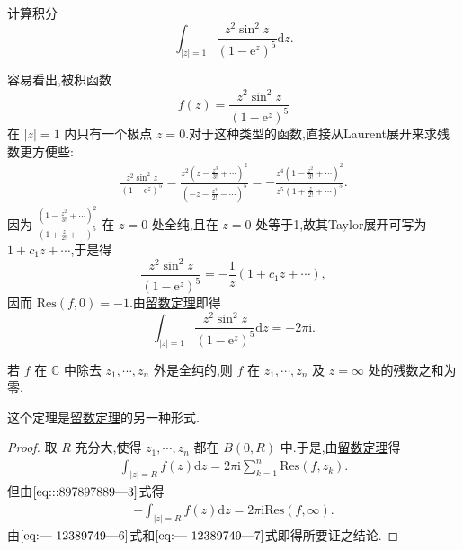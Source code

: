 \documentclass[../../main.tex]{subfiles}
\begin{document}
\begin{example}
计算积分
\[
\int_{|z| = 1} \frac{z^2 \sin^2 z}{(1 - \mathrm{e}^z)^5} \mathrm{d}z.
\]
\end{example}
\begin{solution}
容易看出,被积函数
\[
f(z) = \frac{z^2 \sin^2 z}{(1 - \mathrm{e}^z)^5}
\]
在 \( |z| = 1 \) 内只有一个极点 \( z = 0 \).对于这种类型的函数,直接从Laurent展开来求残数更方便些:
\begin{align*}
\frac{z^2 \sin^2 z}{(1 - \mathrm{e}^z)^5} = \frac{z^2 \left( z - \frac{z^3}{3!} + \cdots \right)^2}{\left( -z - \frac{z^2}{2!} - \cdots \right)^5} = -\frac{z^4 \left( 1 - \frac{z^2}{3!} + \cdots \right)^2}{z^5 \left( 1 + \frac{z}{2!} + \cdots \right)^5}.
\end{align*}
因为 \( \frac{\left( 1 - \frac{z^2}{3!} + \cdots \right)^2}{\left( 1 + \frac{z}{2!} + \cdots \right)^5} \) 在 \( z = 0 \) 处全纯,且在 \( z = 0 \) 处等于1,故其Taylor展开可写为 \( 1 + c_1 z + \cdots \),于是得
\[
\frac{z^2 \sin^2 z}{(1 - \mathrm{e}^z)^5} = -\frac{1}{z} (1 + c_1 z + \cdots),
\]
因而 \( \mathrm{Res}(f, 0) = -1 \).由\hyperref[theorem:留数定理(残数定理)-定理5.4.9]{留数定理}即得
\[
\int_{|z| = 1} \frac{z^2 \sin^2 z}{(1 - \mathrm{e}^z)^5} \mathrm{d}z = -2\pi \mathrm{i}.
\]

\end{solution}

\begin{theorem}\label{theorem:定理5.4.12}
若 \( f \) 在 \( \mathbb{C} \) 中除去 \( z_1, \cdots, z_n \) 外是全纯的,则 \( f \) 在 \( z_1, \cdots, z_n \) 及 \( z = \infty \) 处的残数之和为零.
\end{theorem}
\begin{remark}
这个定理是\hyperref[theorem:留数定理(残数定理)-定理5.4.9]{留数定理}的另一种形式.
\end{remark}
\begin{proof}
取 \( R \) 充分大,使得 \( z_1, \cdots, z_n \) 都在 \( B(0,R) \) 中.于是,由\hyperref[theorem:留数定理(残数定理)-定理5.4.9]{留数定理}得
\begin{align}
\int_{|z| = R} f(z) \mathrm{d}z = 2\pi \mathrm{i} \sum_{k = 1}^{n} \mathrm{Res}(f, z_k).\label{eq:----12389749---6}
\end{align}
但由\(\eqref{eq:::897897889---3}\)式得
\begin{align}\label{eq:----12389749---7}
- \int_{|z| = R} f(z) \mathrm{d}z = 2\pi \mathrm{i} \mathrm{Res}(f, \infty).
\end{align}
由\(\eqref{eq:----12389749---6}\)式和\(\eqref{eq:----12389749---7}\)式即得所要证之结论.

\end{proof}
\end{document}

